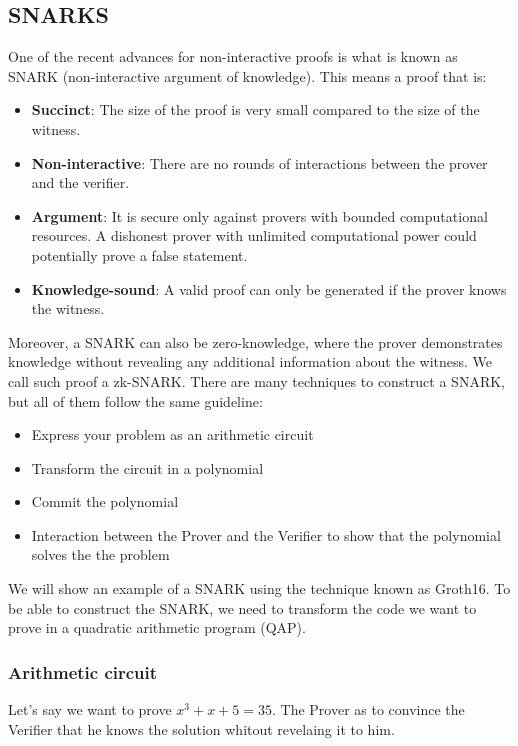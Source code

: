 \subsection{SNARKS}
One of the recent advances for non-interactive proofs is what is known as SNARK (non-interactive argument of knowledge).
This means a proof that is:
\begin{itemize}
\item \textbf{Succinct}: The size of the proof is very small compared to the size of the witness.
\item \textbf{Non-interactive}: There are no rounds of interactions between the prover and the verifier.
\item \textbf{Argument}: It is secure only against provers with bounded computational resources. A dishonest prover with unlimited computational power could potentially prove a false statement.
\item \textbf{Knowledge-sound}: A valid proof can only be generated if the prover knows the witness. \cite{NZ20}
\end{itemize}

Moreover, a SNARK can also be zero-knowledge, where the prover demonstrates knowledge without revealing any additional information about the witness. We call such proof a zk-SNARK.
There are many techniques to construct a SNARK, but all of them follow the same guideline:
\begin{itemize}
   \item Express your problem as an arithmetic circuit
   \item Transform the circuit in a polynomial
   \item Commit the polynomial
   \item Interaction between the Prover and the Verifier to show that the polynomial solves the the problem
 \end{itemize}
 We will show an example of a SNARK using the technique known as Groth16\cite{GR16}.
To be able to construct the SNARK, we need to transform the code we want to prove in a quadratic arithmetic program (QAP).


\subsubsection{Arithmetic circuit}
\label{subsec:ac}

Let's say we want to prove $x^3+x+5=35$.
The Prover as to convince the Verifier that he knows the solution whitout revelaing it to him.

